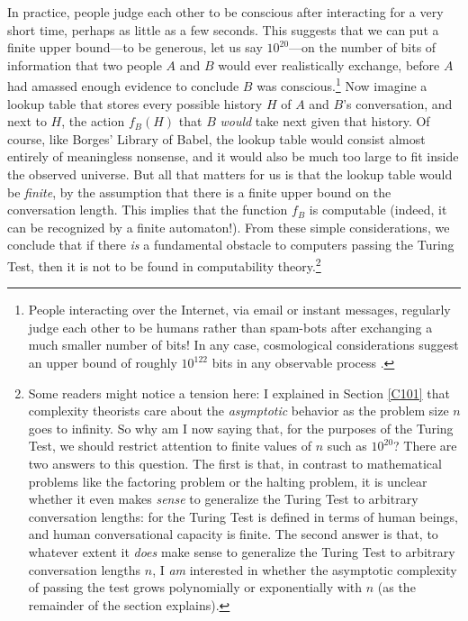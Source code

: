 \documentclass[12pt,onecolumn]{article}%
\begin{document}
In practice, people judge each other to be conscious after interacting for a
very short time, perhaps as little as a few seconds. This suggests that we
can put a finite upper bound---to be generous, let us say $10^{20}$---on the
number of bits of information that two people $A$ and $B$ would ever
realistically exchange, before $A$ had amassed enough evidence to conclude $B$
was conscious.\footnote{People interacting over the Internet, via email or
instant messages, regularly judge each other to be humans rather than
spam-bots after exchanging a much smaller number of bits! In any case,
cosmological considerations suggest an upper bound of roughly $10^{122}$ bits
in any observable process \cite{bousso:vac}.} Now imagine a lookup table
that stores every possible history $H$ of $A$ and $B$'s conversation, and
next to $H$, the action $f_{B}\left(  H\right)  $ that $B$ \textit{would}
take next given that history. Of course, like Borges' Library of Babel, the
lookup table would consist almost entirely of meaningless nonsense, and it
would also be much too large to fit inside the observed universe. But all
that matters for us is that the lookup table would be \textit{finite}, by the
assumption that there is a finite upper bound on the conversation length.
 This implies that the function $f_{B}$ is computable (indeed, it can be
recognized by a finite automaton!). From these simple considerations, we
conclude that if there \textit{is} a fundamental obstacle to computers passing
the Turing Test, then it is not to be found in computability
theory.\footnote{Some readers might notice a tension here: I explained in
Section \ref{C101} that complexity theorists care about the
\textit{asymptotic} behavior as the problem size $n$ goes to infinity. So
why am I now saying that, for the purposes of the Turing Test, we should
restrict attention to finite values of $n$ such as $10^{20}$? There are two
answers to this question. The first is that, in contrast to mathematical
problems like the factoring problem or the halting problem, it is unclear
whether it even makes \textit{sense} to generalize the Turing Test to
arbitrary conversation lengths: for the Turing Test is defined in terms of
human beings, and human conversational capacity is finite. The second answer
is that, to whatever extent it \textit{does} make sense to generalize the
Turing Test to arbitrary conversation lengths $n$, I \textit{am} interested in
whether the asymptotic complexity of passing the test grows polynomially or
exponentially with $n$ (as the remainder of the section explains).}
\end{document}

